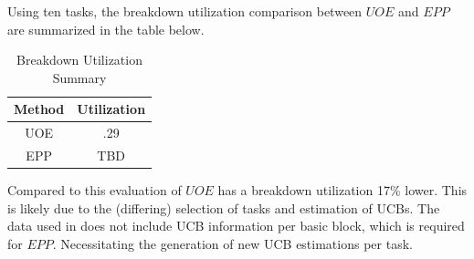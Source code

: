 Using ten tasks, the breakdown utilization comparison between ${UOE}$
and ${EPP}$ are summarized in the table below.
\begin{table}[h!]
\small
\begin{minipage}{\linewidth}
\vspace{-20pt}
  \bigskip
  \centering
    \begin{tabular}{c | c}
      Method & Utilization \\
      \hline
      UOE & .29 \\
      EPP & TBD \\
    \end{tabular}
    \bigskip
    \caption {Breakdown Utilization Summary}
    \label{tab:breakdown_utilization_summary}
\normalsize
\end{minipage}
\normalsize
\end{table}
Compared to \cite{lunniss:13} this evaluation of ${UOE}$ has a
breakdown utilization 17\% lower. This is likely due to the
(differing) selection of tasks and estimation of UCBs. The data used
in \cite{lunniss:13} does not include UCB information per basic block,
which is required for ${EPP}$. Necessitating the generation of new
UCB estimations per task.
%
%
%
